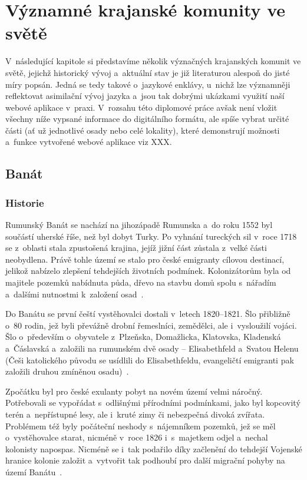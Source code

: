 \hypertarget{vuxfdznamnuxe9-krajanskuxe9-komunity-ve-svux11btux11b}{%
\chapter{Významné krajanské komunity ve světě}\label{vuxfdznamnuxe9-krajanskuxe9-komunity-ve-svux11btux11b}}

V~následující kapitole si představíme několik význačných krajanských komunit ve světě, jejichž historický vývoj a~aktuální stav je již literaturou alespoň do jisté míry popsán. Jedná se tedy takové o~jazykové enklávy, u~nichž lze významněji reflektovat asimilační vývoj jazyka a~jsou tak dobrými ukázkami využití naší webové aplikace v~praxi. V~rozsahu této diplomové práce avšak není vložit všechny níže vypsané informace do digitálního formátu, ale spíše vybrat určité části (ať už jednotlivé osady nebo celé lokality), které demonstrují možnosti a~funkce vytvořené webové aplikace viz XXX.

\hypertarget{banuxe1t}{%
\section{Banát}\label{banuxe1t}}

\hypertarget{historie}{%
\subsection*{Historie}\label{historie}}

Rumunský Banát se nachází na jihozápadě Rumunska a~do roku 1552 byl součástí uherské říše, než byl dobyt Turky. Po vyhnání tureckých sil v~roce 1718 se z~oblasti stala zpustošená krajina, jejíž jižní část zůstala z~velké části neobydlena. Právě tohle území se stalo pro české emigranty cílovou destinací, jelikož nabízelo zlepšení tehdejších životních podmínek. Kolonizátorům byla od majitele pozemků nabídnuta půda, dřevo na stavbu domů spolu s~nářadím a~dalšími nutnostmi k~založení osad~\parencite{Secka1995}.

Do Banátu se první čeští vystěhovalci dostali v~letech 1820--1821. Šlo přibližně o~80 rodin, jež byli převážně drobní řemeslníci, zemědělci, ale i~vysloužilí vojáci. Šlo o~především o~obyvatele z~Plzeňska, Domažlicka, Klatovska, Kladenská a~Čáslavská a~založili na rumunském dvě osady -- Elisabethfeld a~Svatou Helenu (Češi katolického původu se usídlili do Elisabethfeldu, evangeličtí emigranti pak založili druhou zmíněnou osadu)~\parencite{Vaculik2009b}.

Zpočátku byl pro české exulanty pobyt na novém území velmi náročný. Potřebovali se vypořádat s~odlišnými přírodními podmínkami, jako byl kopcovitý terén a~nepřístupné lesy, ale i~kruté zimy či nebezpečná divoká zvířata. Problémem též byly počáteční neshody s~nájemníkem pozemků, jež se měl o~vystěhovalce starat, nicméně v~roce 1826 i~s~majetkem odjel a~nechal kolonisty napospas. Nicméně se i~tak podařilo díky začlenění do tehdejší Vojenské hranice kolonie založit a~vytvořit tak podhoubí pro další migrační pohyby na území Banátu~\parencite{Secka1995}.

